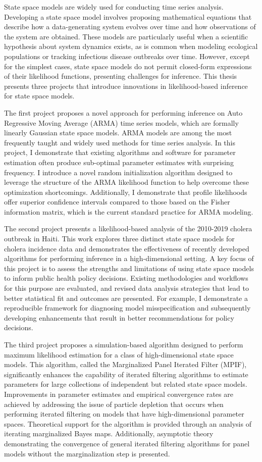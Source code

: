 State space models are widely used for conducting time series analysis.
Developing a state space model involves proposing mathematical equations that describe how a data-generating system evolves over time and how observations of the system are obtained.
These models are particularly useful when a scientific hypothesis about system dynamics exists, as is common when modeling ecological populations or tracking infectious disease outbreaks over time.
However, except for the simplest cases, state space models do not permit closed-form expressions of their likelihood functions, presenting challenges for inference.
This thesis presents three projects that introduce innovations in likelihood-based inference for state space models.

The first project proposes a novel approach for performing inference on Auto Regressive Moving Average (ARMA) time series models, which are formally linearly Gaussian state space models.
ARMA models are among the most frequently taught and widely used methods for time series analysis.
In this project, I demonstrate that existing algorithms and software for parameter estimation often produce sub-optimal parameter estimates with surprising frequency.
I introduce a novel random initialization algorithm designed to leverage the structure of the ARMA likelihood function to help overcome these optimization shortcomings.
Additionally, I demonstrate that profile likelihoods offer superior confidence intervals compared to those based on the Fisher information matrix, which is the current standard practice for ARMA modeling.

The second project presents a likelihood-based analysis of the 2010-2019 cholera outbreak in Haiti.
This work explores three distinct state space models for cholera incidence data and demonstrates the effectiveness of recently developed algorithms for performing inference in a high-dimensional setting.
A key focus of this project is to assess the strengths and limitations of using state space models to inform public health policy decisions.
Existing methodologies and workflows for this purpose are evaluated, and revised data analysis strategies that lead to better statistical fit and outcomes are presented.
For example, I demonstrate a reproducible framework for diagnosing model misspecification and subsequently developing enhancements that result in better recommendations for policy decisions.

The third project proposes a simulation-based algorithm designed to perform maximum likelihood estimation for a class of high-dimensional state space models.
This algorithm, called the Marginalized Panel Iterated Filter (MPIF), significantly enhances the capability of iterated filtering algorithms to estimate parameters for large collections of independent but related state space models.
Improvements in parameter estimates and empirical convergence rates are achieved by addressing the issue of particle depletion that occurs when performing iterated filtering on models that have high-dimensional parameter spaces.
Theoretical support for the algorithm is provided through an analysis of iterating marginalized Bayes maps.
Additionally, asymptotic theory demonstrating the convergence of general iterated filtering algorithms for panel models without the marginalization step is presented. 
